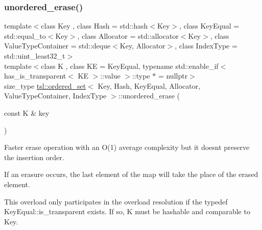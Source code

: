 \subsubsection{\texorpdfstring{unordered\_erase()}{unordered\_erase()}\hspace{0.1cm}{\footnotesize\ttfamily [5/6]}}
{\footnotesize\ttfamily template$<$class Key , class Hash  = std\+::hash$<$\+Key$>$, class Key\+Equal  = std\+::equal\+\_\+to$<$\+Key$>$, class Allocator  = std\+::allocator$<$\+Key$>$, class Value\+Type\+Container  = std\+::deque$<$\+Key, Allocator$>$, class Index\+Type  = std\+::uint\+\_\+least32\+\_\+t$>$ \\
template$<$class K , class KE  = Key\+Equal, typename std\+::enable\+\_\+if$<$ has\+\_\+is\+\_\+transparent$<$ K\+E $>$\+::value $>$\+::type $\ast$  = nullptr$>$ \\
size\+\_\+type \mbox{\hyperlink{classtsl_1_1ordered__set}{tsl\+::ordered\+\_\+set}}$<$ Key, Hash, Key\+Equal, Allocator, Value\+Type\+Container, Index\+Type $>$\+::unordered\+\_\+erase (\begin{DoxyParamCaption}\item[{const K \&}]{key }\end{DoxyParamCaption})\hspace{0.3cm}{\ttfamily [inline]}}





Faster erase operation with an O(1) average complexity but it doesn\textquotesingle{}t preserve the insertion order.

If an erasure occurs, the last element of the map will take the place of the erased element.

This overload only participates in the overload resolution if the typedef Key\+Equal\+::is\+\_\+transparent exists. If so, K must be hashable and comparable to Key. \mbox{\label{classtsl_1_1ordered__set_a979b730573d4d61fd42df217b8bccd20}} 
